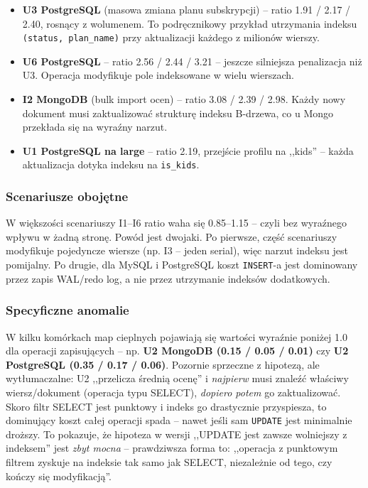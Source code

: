 \begin{itemize}
    \item \textbf{U3 PostgreSQL} (masowa zmiana planu subskrypcji) --
    ratio 1.91 / 2.17 / 2.40, rosnący z wolumenem. To podręcznikowy
    przykład utrzymania indeksu \texttt{(status, plan\_name)} przy
    aktualizacji każdego z milionów wierszy.
    \item \textbf{U6 PostgreSQL} -- ratio 2.56 / 2.44 / 3.21 -- jeszcze
    silniejsza penalizacja niż U3. Operacja modyfikuje pole indeksowane
    w wielu wierszach.
    \item \textbf{I2 MongoDB} (bulk import ocen) -- ratio 3.08 / 2.39 / 2.98.
    Każdy nowy dokument musi zaktualizować strukturę indeksu B-drzewa,
    co u Mongo przekłada się na wyraźny narzut.
    \item \textbf{U1 PostgreSQL na large} -- ratio 2.19, przejście
    profilu na ,,kids'' -- każda aktualizacja dotyka indeksu na
    \texttt{is\_kids}.
\end{itemize}

\subsubsection*{Scenariusze obojętne}

W większości scenariuszy I1--I6 ratio waha się 0.85--1.15 -- czyli
bez wyraźnego wpływu w żadną stronę. Powód jest dwojaki. Po pierwsze,
część scenariuszy modyfikuje pojedyncze wiersze (np. I3 -- jeden
serial), więc narzut indeksu jest pomijalny. Po drugie, dla MySQL
i PostgreSQL koszt \texttt{INSERT}-a jest dominowany przez zapis WAL/redo
log, a nie przez utrzymanie indeksów dodatkowych.

\subsubsection*{Specyficzne anomalie}

W kilku komórkach map cieplnych pojawiają się wartości wyraźnie
poniżej 1.0 dla operacji zapisujących -- np. \textbf{U2 MongoDB
(0.15 / 0.05 / 0.01)} czy \textbf{U2 PostgreSQL (0.35 / 0.17 / 0.06)}.
Pozornie sprzeczne z hipotezą, ale wytłumaczalne: U2 ,,przelicza średnią
ocenę'' i \emph{najpierw} musi znaleźć właściwy wiersz/dokument
(operacja typu SELECT), \emph{dopiero potem} go zaktualizować.
Skoro filtr SELECT jest punktowy i indeks go drastycznie przyspiesza,
to dominujący koszt całej operacji spada -- nawet jeśli sam
\texttt{UPDATE} jest minimalnie droższy. To pokazuje, że hipoteza
w wersji ,,UPDATE jest zawsze wolniejszy z indeksem'' jest
\emph{zbyt mocna} -- prawdziwsza forma to: ,,operacja z punktowym
filtrem zyskuje na indeksie tak samo jak SELECT, niezależnie od tego,
czy kończy się modyfikacją''.

